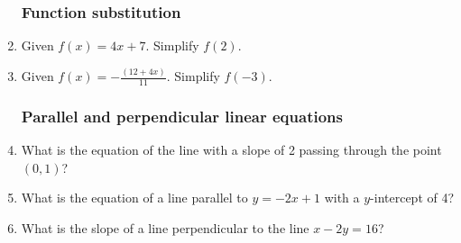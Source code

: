 \documentclass[12pt, oneside]{article}
\begin{document}
\begin{enumerate}
\newpage
  \subsubsection*{Function substitution}
  \item Given $f(x)=4x+7$. Simplify $f(2)$. \vspace{4cm}
  \item Given $\displaystyle f(x)=-\frac{(12+4x)}{11}$. Simplify $f(-3)$.

\newpage
\subsubsection*{Parallel and perpendicular linear equations}

  \item What is the equation of the line with a slope of 2 passing through the point $(0,1)$? \vspace{4cm}
  \item What is the equation of a line parallel to $y=-2x+1$ with a $y$-intercept of 4? \vspace{4cm}
  \item What is the slope of a line perpendicular to the line $x-2y=16$? \vspace{4cm}

\end{enumerate}
\end{document}

